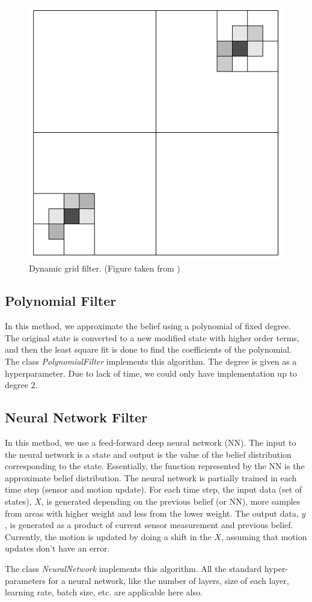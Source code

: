 \begin{figure}
\caption{Dynamic grid filter. (Figure taken from \cite{prob})}
\includegraphics[width=\linewidth]{dgrid}
\end{figure}

\subsection{Polynomial Filter}
In this method, we approximate the belief using a polynomial of fixed degree. The original state is converted to a new modified state with higher order terms, and then the least square fit is done to find the coefficients of the polynomial. The class \textit{PolynomialFilter} implements this algorithm. The degree is given as a hyperparameter. Due to lack of time, we could only have implementation up to degree $2$.

\subsection{Neural Network Filter}
In this method, we use a feed-forward deep neural network (NN). The input to the neural network is a state and output is the value of the belief distribution corresponding to the state. Essentially, the function represented by the NN is the approximate belief distribution. The neural network is partially trained in each time step (sensor and motion update). For each time step, the input data (set of states), $X$, is generated depending on the previous belief (or NN), more samples from areas with higher weight and less from the lower weight. The output data, $y$, is generated as a product of current sensor measurement and previous belief. Currently, the motion is updated by doing a shift in the $X$, assuming that motion updates don't have an error.

The class \textit{NeuralNetwork} implements this algorithm. All the standard hyper-parameters for a neural network, like the number of layers, size of each layer, learning rate, batch size, etc. are applicable here also.